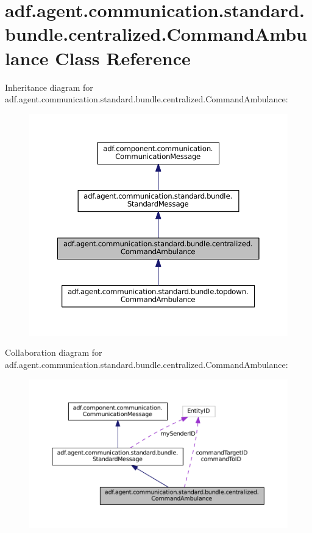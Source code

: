 \hypertarget{classadf_1_1agent_1_1communication_1_1standard_1_1bundle_1_1centralized_1_1CommandAmbulance}{}\section{adf.\+agent.\+communication.\+standard.\+bundle.\+centralized.\+Command\+Ambulance Class Reference}
\label{classadf_1_1agent_1_1communication_1_1standard_1_1bundle_1_1centralized_1_1CommandAmbulance}


Inheritance diagram for adf.\+agent.\+communication.\+standard.\+bundle.\+centralized.\+Command\+Ambulance\+:
\nopagebreak
\begin{figure}[H]
\begin{center}
\leavevmode
\includegraphics[width=350pt]{classadf_1_1agent_1_1communication_1_1standard_1_1bundle_1_1centralized_1_1CommandAmbulance__inherit__graph}
\end{center}
\end{figure}


Collaboration diagram for adf.\+agent.\+communication.\+standard.\+bundle.\+centralized.\+Command\+Ambulance\+:
\nopagebreak
\begin{figure}[H]
\begin{center}
\leavevmode
\includegraphics[width=350pt]{classadf_1_1agent_1_1communication_1_1standard_1_1bundle_1_1centralized_1_1CommandAmbulance__coll__graph}
\end{center}
\end{figure}
